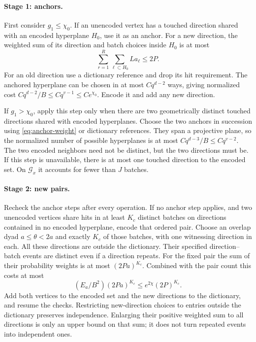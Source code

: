 \paragraph{Stage 1: anchors.}
First consider \(g_1\le\chi_0\).  If an unencoded vertex has a touched
direction shared with an encoded hyperplane \(H_0\), use it as an anchor.
For a new direction, the weighted sum of its direction and batch choices
inside \(H_0\) is at most
\begin{equation}
 \sum_{r=1}^R\sum_{\ell\subset H_0}La_\ell\le 2P.
 \label{eq:anchor-weight}
\end{equation}
For an old direction use a dictionary reference and drop its hit
requirement.  The anchored hyperplane can be chosen in at most
\(Cq^{d-2}\) ways, giving normalized cost
\(Cq^{d-2}/B\le Cq^{v-1}\le Ce^{\chi_0}\).
Encode it and add any new direction.

If \(g_1>\chi_0\), apply this step only when there are two geometrically
distinct touched directions shared with encoded hyperplanes.  Choose
the two anchors in succession using \eqref{eq:anchor-weight} or dictionary
references.  They span a projective plane, so the normalized number of
possible hyperplanes is at most
\(Cq^{d-3}/B\le Cq^{v-2}\).  The two encoded neighbors need not be
distinct, but the two directions must be.  If this step is unavailable,
there is at most one touched direction to the encoded set.  On
\(\mathcal G_x\) it accounts for fewer than \(J\) batches.

\paragraph{Stage 2: new pairs.}
Recheck the anchor steps after every operation.  If no anchor step
applies, and two unencoded vertices share hits in at least \(K_c\)
distinct batches on directions contained in no encoded hyperplane, encode that
ordered pair.  Choose an overlap dyad \(a\le\theta<2a\) and exactly
\(K_c\) of those batches, with one witnessing direction in each.
All these directions are outside the dictionary.  Their specified
direction--batch events are distinct even if a direction repeats.
For the fixed pair the sum of their probability weights is at most
\((2Pa)^{K_c}\).  Combined with the pair count this costs at most
\begin{equation}
 (E_a/B^2)(2Pa)^{K_c}\le e^{2\chi}(2P)^{K_c}.
 \label{eq:pair-certificate-cost}
\end{equation}
Add both vertices to the encoded set and the new directions to the
dictionary, and resume the checks.  Restricting new-direction choices to entries outside the
dictionary preserves independence.  Enlarging their positive weighted
sum to all directions is only an upper bound on that sum; it does not
turn repeated events into independent ones.

